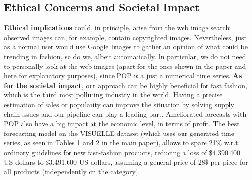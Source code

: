 \documentclass[runningheads]{llncs}
\newcommand{\snamebig}[0] {POP\xspace}
\begin{document}
\subsection{Ethical Concerns and Societal Impact} \label{sec:ethical} 
\textbf{Ethical implications} could, in principle, arise from the web image search: observed images can, for example, contain copyrighted images. Nevertheless, just as a normal user would use Google Images to gather an opinion of what could be trending in fashion, so do we, albeit automatically. In particular, we do not need to personally look at the web images (apart for the ones shown in the paper and here for explanatory purposes), since \snamebig is a just a numerical time series. \textbf{As for the societal impact}, our approach can be highly beneficial for fast fashion, which is the third most polluting industry in the world. Having a precise estimation of sales or popularity can improve the situation by solving supply chain issues and our pipeline can play a leading part. Ameliorated forecasts with \snamebig also have a big impact at the economic level, in terms of profit. The best forecasting model on the VISUELLE dataset (which uses our generated time series, as seen in Tables 1 and 2 in the main paper), allows to spare 21\% w.r.t. ordinary guidelines for new fast-fashion products, reducing a loss of \$4.390.400 US dollars to \$3.491.600 US dollars, assuming a general price of 28\$ per piece for all products (independently on the category).
 
\clearpage


\end{document}
